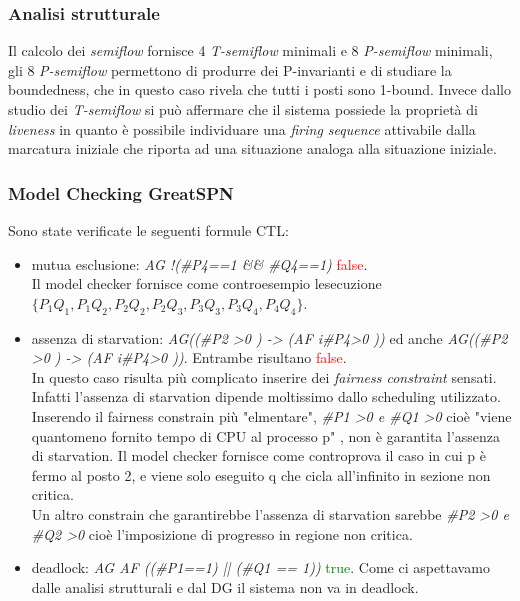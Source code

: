 \documentclass[a4paper]{article}
\begin{document}
\subsubsection{Analisi strutturale}
Il calcolo dei \textit{semiflow} fornisce 4 \textit{T-semiflow} minimali e 8 \textit{P-semiflow} minimali, gli 8 \textit{P-semiflow} permettono di produrre dei P-invarianti e di studiare la boundedness, che in questo caso rivela che tutti i posti sono 1-bound.
Invece dallo studio dei \textit{T-semiflow} si può affermare che il sistema possiede la proprietà di \textit{liveness} in quanto è possibile individuare una \textit{ﬁring sequence} attivabile dalla marcatura iniziale che riporta ad una situazione analoga alla situazione iniziale. %

\subsubsection{Model Checking GreatSPN}
Sono state verificate le seguenti formule CTL:
\begin{itemize}
	\item mutua esclusione: \textit{AG !(\#P4==1 \&\& \#Q4==1)} \textcolor{red}{false}.\\
		Il model checker fornisce come controesempio lesecuzione $\{P_1 Q_1,P_1 Q_2,P_2 Q_2,P_2 Q_3,P_3 Q_3,P_3 Q_4,P_4 Q_4\}$.
	\item assenza di starvation: \textit{AG((\#P2 >0 ) -> (AF i\#P4>0 ))} ed anche \textit{AG((\#P2 >0 ) -> (AF i\#P4>0 ))}. Entrambe risultano \textcolor{red}{false}.\\
		In questo caso risulta più complicato inserire dei \textit{fairness constraint} sensati. Infatti l'assenza di starvation dipende moltissimo dallo scheduling utilizzato.  
		Inserendo il fairness constrain più "elmentare", \textit{\#P1 >0 \textit{e} \#Q1 >0} cioè "viene quantomeno fornito tempo di CPU al processo p" , non è garantita l'assenza di starvation. Il model checker fornisce come controprova il caso in cui p è fermo al posto 2, e viene solo eseguito q che cicla all'infinito in sezione non critica.\\ %
		Un altro constrain che garantirebbe l'assenza di starvation sarebbe \textit{\#P2 >0 \textit{e} \#Q2 >0} cioè l'imposizione di progresso in regione non critica.%
	\item deadlock: \textit{AG AF ((\#P1==1) || (\#Q1 == 1))} \textcolor{green}{true}. Come ci aspettavamo dalle analisi strutturali e dal DG il sistema non va in deadlock.
\end{itemize}
\end{document}
